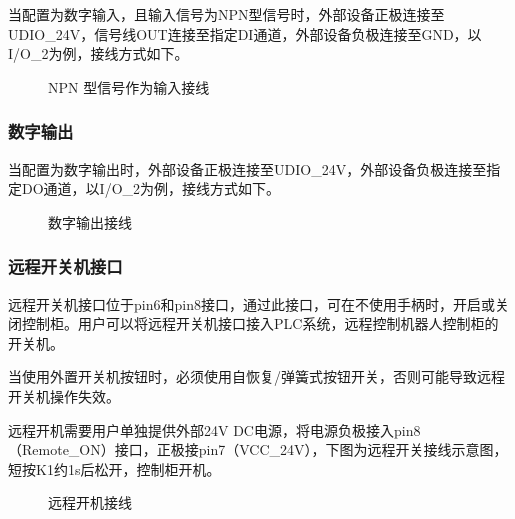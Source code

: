 \documentclass[a4paper,11pt,english,openany,oneside]{sphinxmanual}
\begin{document}
\sphinxAtStartPar
{}

\sphinxAtStartPar
当配置为数字输入，且输入信号为NPN型信号时，外部设备正极连接至UDIO\_24V，信号线OUT连接至指定DI通道，外部设备负极连接至GND，以I/O\_2为例，接线方式如下。

\begin{figure}[H]
\centering
\capstart

\noindent{}
\caption{NPN 型信号作为输入接线}\label{\detokenize{08 _u5b89_u88c5_u4e0e_u8c03_u8bd5:id119}}\end{figure}




\subsubsection{数字输出}
\label{\detokenize{08 _u5b89_u88c5_u4e0e_u8c03_u8bd5:id71}}
\sphinxAtStartPar
当配置为数字输出时，外部设备正极连接至UDIO\_24V，外部设备负极连接至指定DO通道，以I/O\_2为例，接线方式如下。

\begin{figure}[H]
\centering
\capstart

\noindent{}
\caption{数字输出接线}\label{\detokenize{08 _u5b89_u88c5_u4e0e_u8c03_u8bd5:id120}}\end{figure}




\subsubsection{远程开关机接口}
\label{\detokenize{08 _u5b89_u88c5_u4e0e_u8c03_u8bd5:id72}}
\sphinxAtStartPar
远程开关机接口位于pin6和pin8接口，通过此接口，可在不使用手柄时，开启或关闭控制柜。用户可以将远程开关机接口接入PLC系统，远程控制机器人控制柜的开关机。

\sphinxAtStartPar
当使用外置开关机按钮时，必须使用自恢复/弹簧式按钮开关，否则可能导致远程开关机操作失效。

\sphinxAtStartPar
{}

\sphinxAtStartPar
远程开机需要用户单独提供外部24V DC电源，将电源负极接入pin8（Remote\_ON）接口，正极接pin7（VCC\_24V），下图为远程开关接线示意图，短按K1约1s后松开，控制柜开机。

\begin{figure}[H]
\centering
\capstart

\noindent{}
\caption{远程开机接线}\label{\detokenize{08 _u5b89_u88c5_u4e0e_u8c03_u8bd5:id121}}\end{figure}
\end{document}

